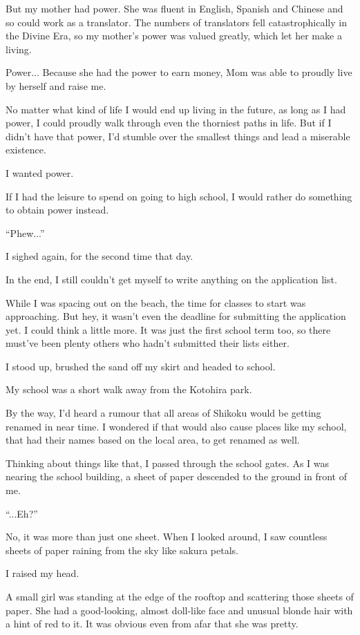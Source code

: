 But my mother had power. She was fluent in English, Spanish and Chinese and so could work as a translator. The numbers of translators fell catastrophically in the Divine Era, so my mother's power was valued greatly, which let her make a living.

Power... Because she had the power to earn money, Mom was able to proudly live by herself and raise me.

No matter what kind of life I would end up living in the future, as long as I had power, I could proudly walk through even the thorniest paths in life. But if I didn't have that power, I'd stumble over the smallest things and lead a miserable existence.

I wanted power.

If I had the leisure to spend on going to high school, I would rather do something to obtain power instead.

``Phew...''

I sighed again, for the second time that day.

In the end, I still couldn't get myself to write anything on the application list.

While I was spacing out on the beach, the time for classes to start was approaching. But hey, it wasn't even the deadline for submitting the application yet. I could think a little more. It was just the first school term too, so there must've been plenty others who hadn't submitted their lists either.

I stood up, brushed the sand off my skirt and headed to school.

My school was a short walk away from the Kotohira park.

By the way, I'd heard a rumour that all areas of Shikoku would be getting renamed in near time. I wondered if that would also cause places like my school, that had their names based on the local area, to get renamed as well.

Thinking about things like that, I passed through the school gates. As I was nearing the school building, a sheet of paper descended to the ground in front of me.

``...Eh?''

No, it was more than just one sheet. When I looked around, I saw countless sheets of paper raining from the sky like sakura petals.

I raised my head.

A small girl was standing at the edge of the rooftop and scattering those sheets of paper. She had a good-looking, almost doll-like face and unusual blonde hair with a hint of red to it. It was obvious even from afar that she was pretty.

